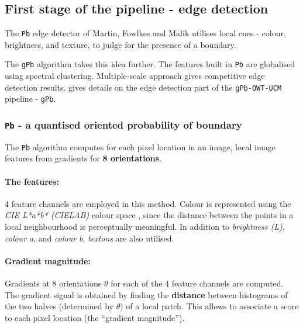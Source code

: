 \subsection{First stage of the pipeline - edge detection} %
\label{sec:ch3-gPb}
The {\tt Pb} edge detector of Martin, Fowlkes and Malik \cite{Martin2004learning} utilises local cues - colour, brightness, and texture, to judge for the presence of a boundary. 

The {\tt gPb} algorithm \cite{Maire2008using} takes this idea further. The features built in {\tt Pb} are globalised using spectral clustering. Multiple-scale approach gives competitive edge detection results.  gives details on the edge detection part of the {\tt gPb-OWT-UCM} pipeline - {\tt gPb}.

\subsubsection{{\tt Pb} - a quantised oriented probability of boundary}
\label{sec:ch3-Pb}
The {\tt Pb}  algorithm computes for each pixel location in an image, local image features from gradients for {\bf 8 orientations}. 

\paragraph{The features:} 4 feature channels are employed in this method. Colour is represented using the \textit{CIE L*a*b* (CIELAB)} colour space \cite{Hoffmann2003cielab}, since the distance between the points in a local neighbourhood is perceptually meaningful. %
In addition to {\it brightness (L)}, {\it colour a}, and {\it colour b}, {\it textons} are also utilised.


\paragraph{Gradient magnitude:} Gradients at 8 orientations $\theta$ for each of the 4 feature channels are computed. The gradient signal is obtained by finding the {\bf distance} %
between histograms of the two halves (determined by $\theta$) of a local patch. This allows to associate a score to each pixel location (the ``gradient magnitude'').


